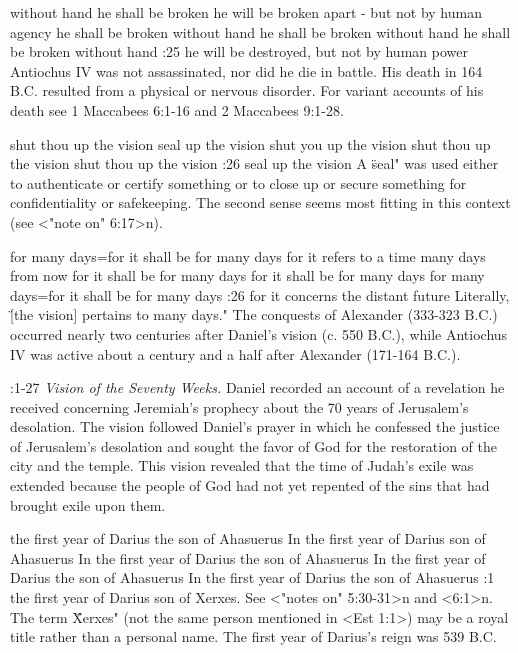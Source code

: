     {without hand he shall be broken} %
    {he will be broken apart - but not by human agency} %
    {he shall be broken without hand} %
    {he shall be broken without hand} %
    {he shall be broken without hand} %
:25 {he will be destroyed, but not by human power} Antiochus IV was not assassinated, nor did he die in battle. 
His death in 164 B.C. resulted from a physical or nervous disorder. For variant accounts of his death see 1 Maccabees 6:1-16 and 2 Maccabees 9:1-28.


    {shut thou up the vision} %
    {seal up the vision} %
    {shut you up the vision} %
    {shut thou up the vision} %
    {shut thou up the vision} %
:26 {seal up the vision} A \"seal" was used either to authenticate 
or certify something or to close up or secure something for confidentiality or safekeeping. The
second sense seems most fitting in  this context (see <"note on" 6:17>n).


    {for many days}={for it shall be for many days} %
    {for it refers to a time many days from now} %
    {for it shall be for many days} %
    {for it shall be for many days} %
    {for many days}={for it shall be for many days} %
:26 {for it concerns the distant future} Literally, \"[the vision]
pertains to many days." The conquests  of Alexander (333-323 B.C.) occurred nearly two centuries after 
Daniel's vision (c. 550 B.C.), while Antiochus IV was active about a century and a half after Alexander (171-164 B.C.).




:1-27 {} {\it Vision of the Seventy Weeks.}\/ Daniel recorded an account of a revelation he received concerning Jeremiah's prophecy about 
the 70 years of Jerusalem's desolation. The vision followed Daniel's prayer in which he confessed the justice of Jerusalem's desolation 
and sought the favor of God for the restoration of the city and the temple. 
This vision revealed that the time of Judah's exile was extended because the people of God had not yet repented of the sins  that had brought exile upon them.

    {the first year of Darius the son of Ahasuerus} %
    {In the first year of Darius son of Ahasuerus} %
    {In the first year of Darius the son of Ahasuerus} %
    {In the first year of Darius the son of Ahasuerus} %
    {In the first year of Darius the son of Ahasuerus} %
:1 {the first year of Darius son of Xerxes.} See <"notes on" 5:30-31>n 
and <6:1>n. The term \"Xerxes" (not the same person mentioned in <Est 1:1>) may be a royal title rather than a personal name. The first year 
of Darius's reign was 539 B.C.

